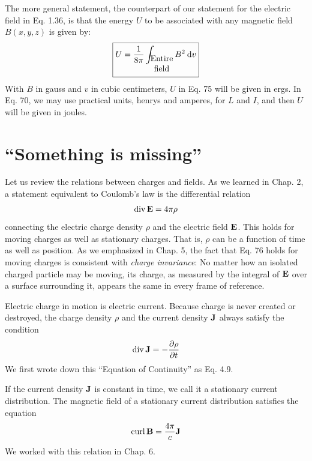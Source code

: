 The more general statement, the counterpart of our statement for
the electric field in Eq. 1.36, is that the energy $U$ to be associated with
any magnetic field $B(x,y,z)$ is given by:
\begin{equation}
\boxed{
  U = \frac{1}{8\pi}\int_{\begin{matrix}\text{Entire}\\ \text{field}\end{matrix}} B^2\:\textup{d} v
}
\end{equation}
With $B$ in gauss and $v$ in cubic centimeters, $U$ in Eq. 75 will be given
in ergs. In Eq. 70, we may use practical units, henrys and amperes,
for $L$ and $I$, and then $U$ will be given in joules.

\section{``Something is missing''}

Let us review the relations between charges and fields. As we
learned in Chap. 2, a statement equivalent to Coulomb's law is the
differential relation
\begin{equation}
  \operatorname{div}\mathbf{E} = 4 \pi\rho
\end{equation}
connecting the electric charge density $\rho$ and the electric field $\mathbf{E}$. This
holds for moving charges as well as stationary charges. That is, $\rho$ can
be a function of time as well as position. As we emphasized in
Chap. 5, the fact that Eq. 76 holds for moving charges is consistent
with \emph{charge invariance}: No matter how an isolated charged particle
may be moving, its charge, as measured by the integral of $\mathbf{E}$ over a
surface surrounding it, appears the same in every frame of reference.


Electric charge in motion is electric current. Because charge is
never created or destroyed, the charge density $\rho$ and the current
density $\mathbf{J}$ always satisfy the condition
\begin{equation}
  \operatorname{div}\mathbf{J} = -\frac{\partial\rho}{\partial t}
\end{equation}
We first wrote down this ``Equation of Continuity'' as Eq. 4.9.

If the current density $\mathbf{J}$ is constant in time, we call it a stationary
current distribution. The magnetic field of a stationary current distribution
satisfies the equation
\begin{equation}
  \operatorname{curl}\mathbf{B} = \frac{4\pi}{c}\mathbf{J}
\end{equation}
We worked with this relation in Chap. 6.

